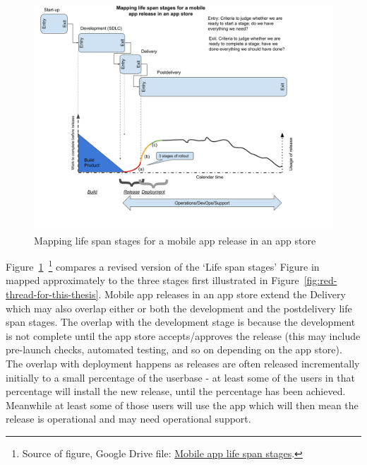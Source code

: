 \begin{figure}
    \centering
    \includegraphics[width=16cm]{images/my/mobile-app-life-span-stages.png}
    \caption{Mapping life span stages for a mobile app release in an app store}
    \label{fig:mobile-app-life-span-stages}
\end{figure}

Figure~\ref{fig:mobile-app-life-span-stages}~\footnote{Source of figure, Google Drive file: \href{https://docs.google.com/document/d/1d4B5l1tlpclHdKwY8W00qchiCV2YK5JjJP8TbkRHcjQ/edit}{Mobile app life span stages}.} compares a revised version of the `Life span stages' Figure in~\citep[p.155]{evans2004_achieving_software_quality_through_teamwork} mapped approximately to the three stages first illustrated in Figure~\ref{fig:red-thread-for-this-thesis}. Mobile app releases in an app store extend the Delivery which may also overlap either or both the development and the postdelivery life span stages. The overlap with the development stage is because the development is not complete until the app store accepts/approves the release (this may include pre-launch checks, automated testing, and so on depending on the app store). The overlap with deployment happens as releases are often released incrementally initially to a small percentage of the userbase - at least some of the users in that percentage will install the new release, until the percentage has been achieved. Meanwhile at least some of those users will use the app which will then mean the release is operational and may need operational support.


